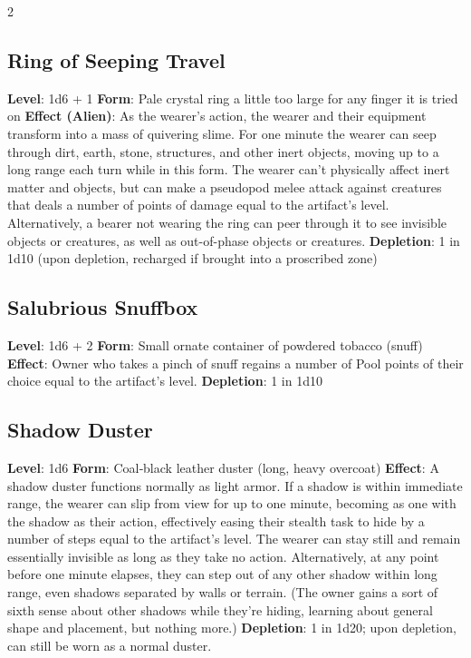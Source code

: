 \begin{multicols}{2}
\subsection{Ring of Seeping Travel}
\textbf{Level}: 1d6 + 1 
\textbf{Form}: Pale crystal ring a little too large for any finger it is tried on 
\textbf{Effect (Alien)}: As the wearer’s action, the wearer and their equipment transform into a mass of quivering slime. For one minute the wearer can seep through dirt, earth, stone, structures, and other inert objects, moving up to a long range each turn while in this form. The wearer can’t physically affect inert matter and objects, but can make a pseudopod melee attack against creatures that deals a number of points of damage equal to the artifact’s level. 
Alternatively, a bearer not wearing the ring can peer through it to see invisible objects or creatures, as well as out-of-phase objects or creatures. 
\textbf{Depletion}: 1 in 1d10 (upon depletion, recharged if brought into a proscribed zone)

\subsection{Salubrious Snuffbox}
\textbf{Level}: 1d6 + 2 
\textbf{Form}: Small ornate container of powdered tobacco (snuff) 
\textbf{Effect}: Owner who takes a pinch of snuff regains a number of Pool points of their choice equal to the artifact’s level. 
\textbf{Depletion}: 1 in 1d10

\subsection{Shadow Duster}
\textbf{Level}: 1d6 
\textbf{Form}: Coal‑black leather duster (long, heavy overcoat) 
\textbf{Effect}: A shadow duster functions normally as light armor. If a shadow is within immediate range, the wearer can slip from view for up to one minute, becoming as one with the shadow as their action, effectively easing their stealth task to hide by a number of steps equal to the artifact’s level. The wearer can stay still and remain essentially invisible as long as they take no action. Alternatively, at any point before one minute elapses, they can step out of any other shadow within long range, even shadows separated by walls or terrain. (The owner gains a sort of sixth sense about other shadows while they’re hiding, learning about general shape and placement, but nothing more.) 
\textbf{Depletion}: 1 in 1d20; upon depletion, can still be worn as a normal duster.


\end{multicols}
